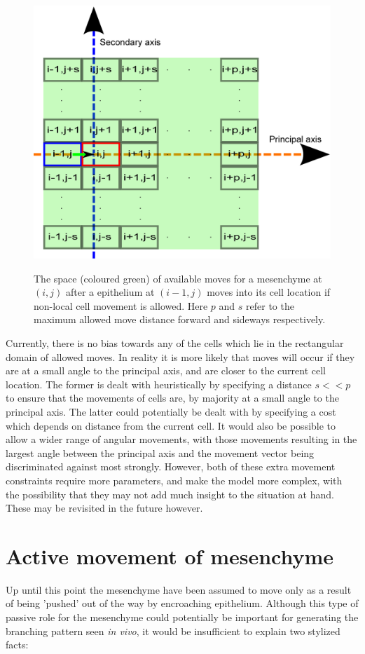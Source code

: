 \documentclass[pdftex,10pt,a4paper]{article}
\begin{document}
\begin{figure}[t] 
\centering
\scalebox{0.5} 
{\includegraphics{rectangular.eps}}
\caption{The space (coloured green) of available moves for a mesenchyme at $(i,j)$ after a epithelium at $(i-1,j)$ moves into its cell location if non-local cell movement is allowed. Here $p$ and $s$ refer to the maximum allowed move distance forward and sideways respectively.}\label{fig:rectangular}
\end{figure} 

Currently, there is no bias towards any of the cells which lie in the rectangular domain of allowed moves. In reality it is more likely that moves will occur if they are at a small angle to the principal axis, and are closer to the current cell location. The former is dealt with heuristically by specifying a distance $s<<p$ to ensure that the movements of cells are, by majority at a small angle to the principal axis. The latter could potentially be dealt with by specifying a cost which depends on distance from the current cell. It would also be possible to allow a wider range of angular movements, with those movements resulting in the largest angle between the principal axis and the movement vector being discriminated against most strongly. However, both of these extra movement constraints require more parameters, and make the model more complex, with the possibility that they may not add much insight to the situation at hand. These may be revisited in the future however.

\section{Active movement of mesenchyme}
Up until this point the mesenchyme have been assumed to move only as a result of being 'pushed' out of the way by encroaching epithelium. Although this type of passive role for the mesenchyme could potentially be important for generating the branching pattern seen \textit{in vivo}, it would be insufficient to explain two stylized facts:
\end{document}
